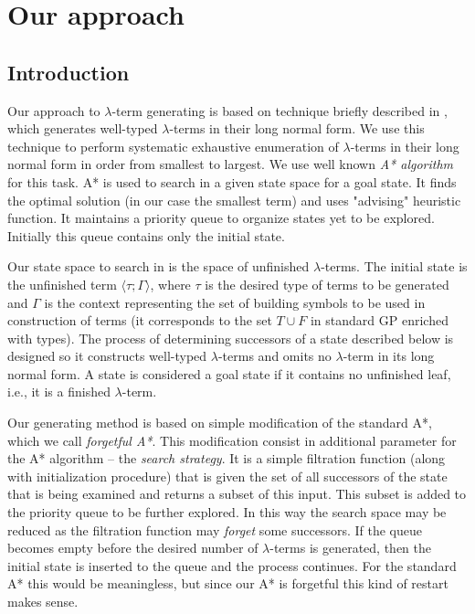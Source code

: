 \documentclass[conference]{IEEEtran}
\newcommand{\lterm}{$\lambda$-term\xspace}
\newcommand{\lterms}{$\lambda$-terms\xspace}
\newcommand{\ul}[2]{\langle #1 ; #2 \rangle}
\begin{document}
\section{Our approach}
\label{approach}

\subsection{Introduction}

Our approach to \lterm generating is based on technique 
briefly described in \cite{barendregt10}, which generates
well-typed \lterms in their long normal form. 
We use this technique to perform systematic exhaustive enumeration
of \lterms in their long normal form in order from smallest to largest.
We use well known \textit{A* algorithm} \cite{AIMA} for this task.
A* is used to search in a given state space for a goal state. 
It finds the optimal solution (in our case the smallest term)
and uses "advising" heuristic function.
It maintains a priority queue to organize states yet to be explored.
Initially this queue contains only the initial state.  

Our state space to search in is the space of unfinished \lterms. 
The initial state is the unfinished term $\ul{\tau}{\Gamma}$, 
where $\tau$ is the desired type of
terms to be generated and $\Gamma$ is the context
representing the set of building symbols to be used in construction of
terms (it corresponds to the set $T \cup F$ in
standard GP enriched with types). The process of determining 
successors of a state described below is designed so it constructs well-typed 
\lterms and omits no \lterm in its long normal form. 
A state is considered a goal state if it contains no unfinished
leaf, i.e., it is a finished \lterm.

Our generating method is based on simple modification of the
standard A*, which we call \textit{forgetful A*}. This modification consist in 
additional parameter for the A* algorithm -- the \textit{search strategy}. 
It is a simple filtration function (along with initialization procedure)
that is given the set of all successors of the state that is being examined
and returns a subset of this input. This subset is added to the priority queue 
to be further explored. In this way the search space may be reduced as 
the filtration function may \textit{forget} some successors.
If the queue becomes empty before the desired number of \lterms
is generated, then the initial state is inserted to the queue
and the process continues. For the standard A* this would be meaningless,
but since our A* is forgetful this kind of restart makes sense.
\end{document}
